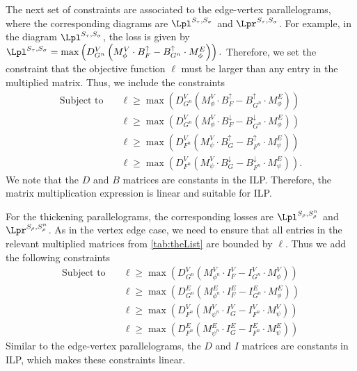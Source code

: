 %
The next set of constraints are associated to  the edge-vertex parallelograms, where the corresponding diagrams are $\Lpl^{S_\tau, S_\sigma}$ and $\Lpr^{S_\tau, S_\sigma}$.  
For example, in the diagram $\Lpl^{S_\tau, S_\sigma}$, the loss is given by 
    $
       \Lpl^{S_\tau, S_\sigma} =  \max \left( D_{G^n}^V \left(M_{\phi}^V \cdot B_F^{\uparrow} - B_{G^n}^{\uparrow} \cdot M_{\phi}^E\right)\right).
       $
Therefore, we set the constraint that the objective function $\ell$ must be larger than any entry in the multiplied matrix. 
Thus, we include the constraints 
\begin{align*}
\text{Subject to} \quad 
%
 & \ell \geq  \max\left({D_{G^n}^V \left(M_{\phi}^V \cdot B_F^{\uparrow} - B_{G^n}^{\uparrow} \cdot M_{\phi}^E\right)}\right) \\
& \ell \geq \max\left({D_{G^n}^V \left(M_{\phi}^V \cdot B_F^{\downarrow} - B_{G^n}^{\downarrow} \cdot M_{\phi}^E\right)}\right)  \\
& \ell \geq \max\left({D_{F^n}^V \left(M_{\psi}^V \cdot B_G^{\uparrow} - B_{F^n}^{\uparrow} \cdot M_{\psi}^E\right)}\right) \\
& \ell \geq \max\left({ D_{F^n}^V \left(M_{\psi}^V \cdot B_G^{\downarrow} - B_{F^n}^{\downarrow} \cdot M_{\psi}^E\right)}\right).
%
\end{align*}
    We note that the $D$ and $B$ matrices  are constants in the ILP.
    Therefore, the matrix multiplication expression is linear and suitable for ILP.



For the thickening parallelograms, the corresponding losses are $\Lpl^{S_\rho, S_\rho^n}$ and $\Lpr^{S_\rho, S_\rho^n}$.  
As in the vertex edge case, we need to ensure that all entries in the relevant multiplied matrices from \cref{tab:theList} are bounded by $\ell$. 
Thus we add the following constraints 
\begin{align*}
\text{Subject to} \quad 
& \ell \geq \max\left( D_{G^n}^V \left(M_{\phi^n}^V \cdot I_F^V - I_{G^n}^V \cdot M_{\phi}^V\right)\right) \\
&\ell \geq \max\left( D_{G^n}^E \left(M_{\phi^n}^E \cdot I_F^E - I_{G^n}^E \cdot M_{\phi}^E\right)\right)\\ 
&\ell \geq \max\left( D_{F^n}^V \left(M_{\psi^n}^V \cdot I_G^V - I_{F^n}^V \cdot M_{\psi}^V\right)\right)\\
&\ell \geq \max\left( D_{F^n}^E \left(M_{\psi^n}^E \cdot I_G^E - I_{F^n}^E \cdot M_{\psi}^E\right)\right)
\end{align*}
    Similar to the edge-vertex parallelograms, the $D$ and $I$ matrices are constants in ILP, which makes these constraints linear.

